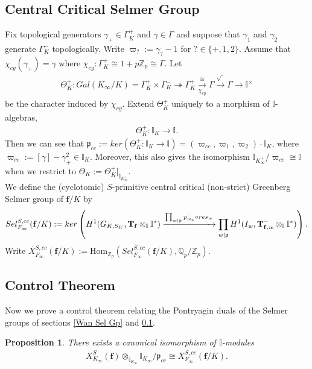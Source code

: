 \documentclass[reqno,10pt]{amsart}
\newcommand{\zp}{\mathbb{Z}_{p}}
\newcommand{\qp}{\mathbb{Q}_{p}}
\newcommand{\I}{\mathbb{I}}
\newcommand{\f}{\mathbf{f}}
\newcommand{\T}{\mathbf{T}}
\newcommand{\p}{\mathfrak{p}}
\newcommand{\kinf}{K_\infty}
\newcommand{\ikip}{\I_{K_\infty^+}}
\newcommand{\vp}{\varpi}
\theoremstyle{plain}
\newtheorem{prop}[thm]{Proposition}
\theoremstyle{definition}
\begin{document}
\subsection{Central Critical Selmer Group} \label{cc Sel Gp}
Fix topological generators $\gamma_+ \in \Gamma_K^+$ and $\gamma \in \Gamma$ and suppose that $\gamma_{1}$ and $\gamma_2$ generate $\Gamma_K^-$ topologically. Write $\varpi_? := \gamma_? -1$ for $? \in \{+,1,2\}$. Assume that $\chi_{cy}(\gamma_+) = \gamma$ where $\chi_{cy} : \Gamma_K^+ \cong 1+p\zp \cong \Gamma$. Let
\begin{align*}
    \Theta_K^+ : Gal(K_\infty/K) = \Gamma_K^+ \times \Gamma_K^- \twoheadrightarrow \Gamma_K^+ \xrightarrow[\chi_{cy}]{\cong} \Gamma \xrightarrow{\sqrt{\cdot}} \Gamma \rightarrow \I^\times
\end{align*}
be the character induced by $\chi_{cy}$. Extend $\Theta_K^+$ uniquely to a morphism of $\I$-algebras,
\begin{align*}
    \Theta_K^+ : \I_K \rightarrow \I.
\end{align*}
Then we can see that $\mathfrak{p}_{cc} := ker(\Theta_K^+ : \I_K \rightarrow \I) = (\varpi_{cc},\varpi_1,\varpi_2) \cdot \I_K$, where $\varpi_{cc} := [\gamma] - \gamma_+^2 \in \I_K$. Moreover, this also gives the isomorphism $\ikip/\vp_{cc} \cong \I$ when we restrict to $\Theta_K := \Theta_K^+|_{\ikip}$. 
\\
We define the (cyclotomic) $S$-primitive central critical (non-strict) Greenberg Selmer group of $\f/K$ by
\begin{align*}
    Sel^{S,cc}_{F_\infty}(\f/K) := ker\left(H^1(G_{K,S_K},\T_\f \otimes_\I \I^*) \xrightarrow{\prod_{w|\p}p_{w_*}^-\circ \hspace{0.1mm} res_w} \prod_{w|\p} H^1(I_w,\T_{\f,w}^- \otimes_\I \I^*) \right).
\end{align*}
Write $X^{S,cc}_{F_\infty}(\f/K) := \mathrm{Hom}_{\zp}( Sel^{S,cc}_{F_\infty}(\f/K),\qp/\zp).$

\subsection{Control Theorem} \label{control theorem}
Now we prove a control theorem relating the Pontryagin duals of the Selmer groups of sections \ref{Wan Sel Gp} and \ref{cc Sel Gp}.

\begin{prop} \label{ControlTheorem}
    There exists a canonical isomorphism of $\I$-modules
    \begin{align*}
        X_{K_\infty}^S(\f) \otimes_{\I_{\kinf}} \I_{\kinf}/\mathfrak{p}_{cc} \cong X_{F_\infty}^{S,cc}(\f/K).
    \end{align*}
\end{prop}
\end{document}
